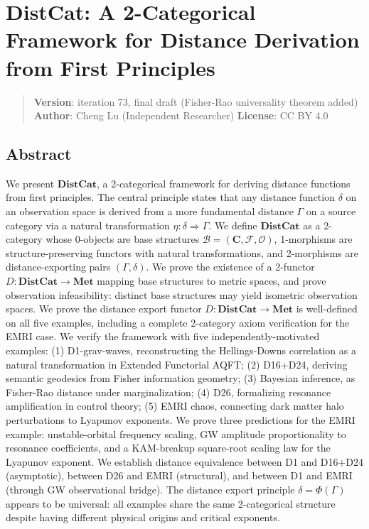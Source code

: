 \documentclass[
]{article}
\author{}
\date{}
\begin{document}
\section{DistCat: A 2-Categorical Framework for Distance Derivation from
First
Principles}\label{distcat-a-2-categorical-framework-for-distance-derivation-from-first-principles}

\begin{quote}
\textbf{Version}: iteration 73, final draft (Fisher-Rao universality
theorem added) \textbf{Author}: Cheng Lu (Independent Researcher)
\textbf{License}: CC BY 4.0
\end{quote}

\subsection{Abstract}\label{abstract}

We present \(\mathbf{DistCat}\), a 2-categorical framework for deriving
distance functions from first principles. The central principle states
that any distance function \(\delta\) on an observation space is derived
from a more fundamental distance \(\Gamma\) on a source category via a
natural transformation \(\eta: \delta \Rightarrow \Gamma\). We define
\(\mathbf{DistCat}\) as a 2-category whose 0-objects are base structures
\(\mathcal{B}=(\mathbf{C},\mathcal{F},\mathcal{O})\), 1-morphisms are
structure-preserving functors with natural transformations, and
2-morphisms are distance-exporting pairs \((\Gamma,\delta)\). We prove
the existence of a 2-functor \(D: \mathbf{DistCat} \to \mathbf{Met}\)
mapping base structures to metric spaces, and prove observation
infeasibility: distinct base structures may yield isometric observation
spaces. We prove the distance export functor
\(D: \mathbf{DistCat} \to \mathbf{Met}\) is well-defined on all five
examples, including a complete 2-category axiom verification for the
EMRI case. We verify the framework with five independently-motivated
examples: (1) D1-grav-waves, reconstructing the Hellings-Downs
correlation as a natural transformation in Extended Functorial AQFT; (2)
D16+D24, deriving semantic geodesics from Fisher information geometry;
(3) Bayesian inference, as Fisher-Rao distance under marginalization;
(4) D26, formalizing resonance amplification in control theory; (5) EMRI
chaos, connecting dark matter halo perturbations to Lyapunov exponents.
We prove three predictions for the EMRI example: unstable-orbital
frequency scaling, GW amplitude proportionality to resonance
coefficients, and a KAM-breakup square-root scaling law for the Lyapunov
exponent. We establish distance equivalence between D1 and D16+D24
(asymptotic), between D26 and EMRI (structural), and between D1 and EMRI
(through GW observational bridge). The distance export principle
\(\delta = \Phi(\Gamma)\) appears to be universal: all examples share
the same 2-categorical structure despite having different physical
origins and critical exponents.
\end{document}

